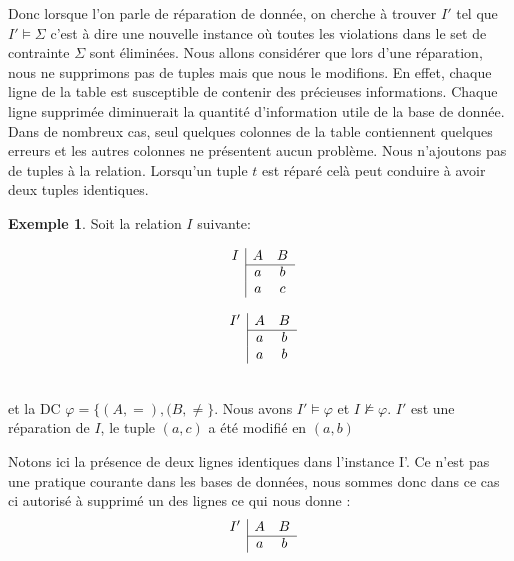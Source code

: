 \documentclass[letterpaper, 12pt]{report}
\theoremstyle{definition}
\newtheorem{myexample}{Exemple}
\begin{document}
Donc lorsque l'on parle de réparation de donnée, on cherche à trouver $I'$ tel que $I' \models \Sigma$ c'est à dire une nouvelle instance où toutes les violations dans le set de contrainte $\Sigma$ sont éliminées. Nous allons considérer que lors d'une réparation, nous ne supprimons pas de tuples mais que nous le modifions. En effet, chaque ligne de la table est susceptible de contenir des précieuses informations. Chaque ligne supprimée diminuerait la quantité d'information utile de la base de donnée. Dans de nombreux cas, seul quelques colonnes de la table contiennent quelques erreurs et les autres colonnes ne présentent aucun problème.  Nous n'ajoutons pas de tuples à la relation. Lorsqu'un tuple $t$ est réparé celà peut conduire à avoir deux tuples identiques. \\

\begin{myexample}
	Soit la relation $I$ suivante:\\
	\begin{minipage}{.45\textwidth}\centering
		$$
		\begin{array}{c|cc}
		I & A & B\\\cline{2-3}
 		 & a & b\\
 		 & a & c
		\end{array}  
		$$
	\end{minipage}
	\begin{minipage}{.45\textwidth}\centering
		$$
		\begin{array}{c|cc}
		I' & A & B\\\cline{2-3}
 		 & a & b\\
 		 & a & b
		\end{array}  
		$$
	\end{minipage}~\\
et la DC $\varphi = \{ (A,=),(B,\neq\}$. Nous avons $I' \models \varphi$ et $I \not\models \varphi$. $I'$ est une réparation de $I$, le tuple $(a,c)$ a été modifié en $(a,b)$

Notons ici la présence de deux lignes identiques dans l'instance I'. Ce n'est pas une pratique courante dans les bases de données, nous sommes donc dans ce cas ci autorisé à supprimé un des lignes ce qui nous donne :\\
$$
		\begin{array}{c|cc}
		I' & A & B\\\cline{2-3}
 		 & a & b
		\end{array}  
		$$
\end{myexample}
\end{document}
